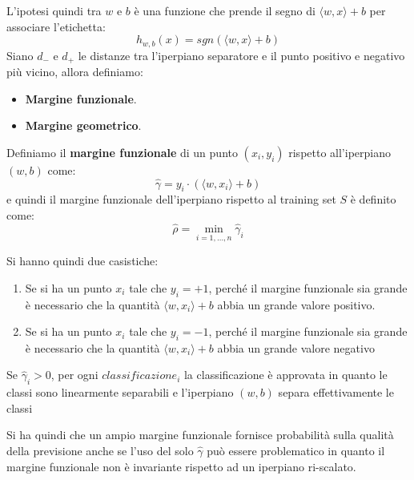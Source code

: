 L'ipotesi quindi tra $w$ e $b$ è una funzione che prende il segno di $\langle w, x \rangle + b$ per associare l'etichetta:
\begin{equation}
    h_{w,b} (x) = sgn(\langle w, x \rangle + b)
\end{equation}
Siano $d_{-}$ e $d_{+}$ le distanze tra l'iperpiano separatore e il punto positivo e negativo più vicino, allora definiamo:
\begin{itemize}
    \item \textbf{Margine funzionale}.
    \item \textbf{Margine geometrico}.
\end{itemize}
\begin{definizione}
    Definiamo il \textbf{margine funzionale} di un punto $(x_i, y_i)$ rispetto all'iperpiano $(w, b)$ come:
    \begin{equation}
        \hat{\gamma} = y_i \cdot ( \langle w, x_i \rangle + b )
    \end{equation}
    e quindi il margine funzionale dell'iperpiano rispetto al training set $S$ è definito come:
    \begin{equation}
        \hat{\rho} = \min_{i = 1, \dots, n} \hat{\gamma}_i
    \end{equation}
\end{definizione}
Si hanno quindi due casistiche:
\begin{enumerate}
    \item Se si ha un punto $x_i$ tale che $y_i = +1$, perché il margine funzionale sia grande è necessario che la quantità $\langle w, x_i \rangle + b$ abbia un grande valore positivo.
    \item Se si ha un punto $x_i$ tale che $y_i = -1$, perché il margine funzionale sia grande è necessario che la quantità $\langle w, x_i \rangle + b$ abbia un grande valore negativo
\end{enumerate}
\begin{teorema}
    Se $\hat{\gamma}_i > 0$, per ogni $classificazione_i$ la classificazione è approvata in quanto le classi sono linearmente separabili e l'iperpiano $(w, b)$ separa effettivamente le classi
\end{teorema}
Si ha quindi che un ampio margine funzionale fornisce probabilità sulla qualità della previsione anche se l'uso del solo $\hat{\gamma}$ può essere problematico in quanto il margine funzionale non è invariante rispetto ad un iperpiano ri-scalato.

